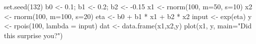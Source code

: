 \begin{Schunk}
\begin{Sinput}
 set.seed(132)
 b0 <- 0.1; b1 <- 0.2; b2 <- -0.15
 x1 <- rnorm(100, m=50, s=10)
 x2 <- rnorm(100, m=100, s=20)
 eta <- b0 + b1 * x1 + b2 * x2
 input <- exp(eta)
 y <- rpois(100, lambda = input)
 dat <- data.frame(x1,x2,y)
 plot(x1, y, main="Did this surprise you?")
\end{Sinput}
\end{Schunk}
